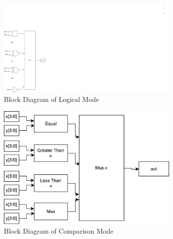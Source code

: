 \documentclass[11pt]{article}
\begin{document}
\begin{figure}[H]
    \centering
    \includegraphics[clip, trim=0cm 0cm 45cm 10cm, width=0.8\textwidth]{Logical_BD.pdf}
    \caption{Block Diagram of Logical Mode}
    \label{fig:logicaldrawn}
\end{figure}

\begin{figure}[H]
    \centering
    \includegraphics[clip, width=0.8\textwidth]{Comparison_BD.pdf}
    \caption{Block Diagram of Comparison Mode}
    \label{fig:comparisondrawn}
\end{figure}
\end{document}
